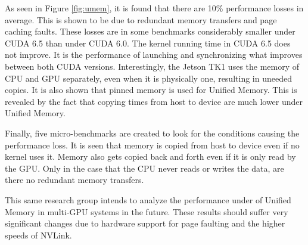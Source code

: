 As seen in Figure \ref{fig:umem}, it is found that there are 10\% performance losses in average.
This is shown to be due to redundant memory transfers and page caching faults.
These losses are in some benchmarks considerably smaller under CUDA 6.5 than under CUDA 6.0.
The kernel running time in CUDA 6.5 does not improve.
It is the performance of launching and synchronizing what improves between both CUDA versions.
Interestingly, the Jetson TK1 uses the memory of CPU and GPU separately, even when it is physically one, resulting in uneeded copies.
It is also shown that pinned memory is used for Unified Memory.
This is revealed by the fact that copying times from host to device are much lower under Unified Memory.

Finally, five micro-benchmarks are created to look for the conditions causing the performance loss.
It is seen that memory is copied from host to device even if no kernel uses it.
Memory also gets copied back and forth even if it is only read by the GPU.
Only in the case that the CPU never reads or writes the data, are there no redundant memory transfers.

This same research group intends to analyze the performance under of Unified Memory in multi-GPU systems in the future.
These results should suffer very significant changes due to hardware support for page faulting and the higher speeds of NVLink.
